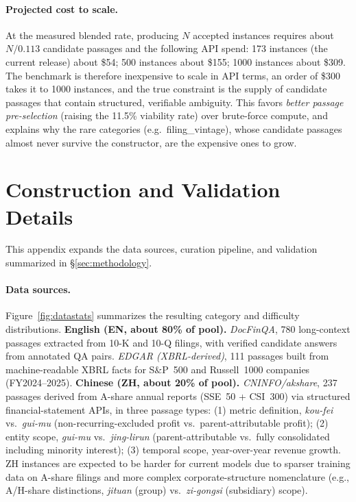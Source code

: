 \paragraph{Projected cost to scale.} At the measured blended rate, producing $N$
accepted instances requires about $N/0.113$ candidate passages and the
following API spend: 173 instances (the current release) about \$54;
500 instances about \$155; 1000 instances about \$309. The
benchmark is therefore inexpensive to scale in API terms, an order of
\$300 takes it to 1000 instances, and the true constraint is the supply of
candidate passages that contain structured, verifiable ambiguity. This favors
\emph{better passage pre-selection} (raising the 11.5\% viability rate) over
brute-force compute, and explains why the rare categories (e.g.\ filing\_vintage),
whose candidate passages almost never survive the constructor, are the expensive
ones to grow.

\section{Construction and Validation Details}
\label{app:construction}

This appendix expands the data sources, curation pipeline, and validation summarized in
\S\ref{sec:methodology}.

\paragraph{Data sources.}
Figure~\ref{fig:datastats} summarizes the resulting category and difficulty distributions.
\textbf{English (EN, about 80\% of pool).} \textit{DocFinQA}, 780 long-context passages extracted
from 10-K and 10-Q filings, with verified candidate answers from annotated QA pairs.
\textit{EDGAR (XBRL-derived)}, 111 passages built from machine-readable XBRL facts for S\&P~500 and
Russell~1000 companies (FY2024--2025). \textbf{Chinese (ZH, about 20\% of pool).}
\textit{CNINFO/akshare}, 237 passages derived from A-share annual reports (SSE~50 + CSI~300) via
structured financial-statement APIs, in three passage types: (1) metric definition, \emph{kou-fei}
vs.\ \emph{gui-mu} (non-recurring-excluded profit vs.\ parent-attributable profit); (2) entity
scope, \emph{gui-mu} vs.\ \emph{jing-lirun} (parent-attributable vs.\ fully consolidated including
minority interest); (3) temporal scope, year-over-year revenue growth. ZH instances are expected to
be harder for current models due to sparser training data on A-share filings and more complex
corporate-structure nomenclature (e.g., A/H-share distinctions, \emph{jituan} (group) vs.\
\emph{zi-gongsi} (subsidiary) scope).

